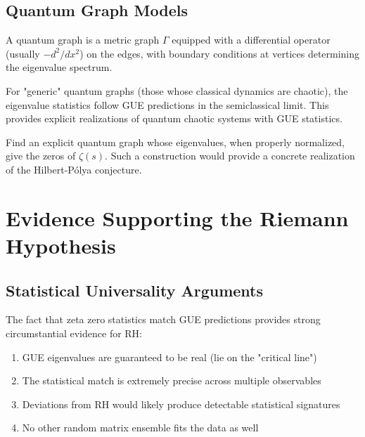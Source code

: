 \subsection{Quantum Graph Models}

\begin{definition}
A quantum graph is a metric graph $\Gamma$ equipped with a differential operator (usually $-d^2/dx^2$) on the edges, with boundary conditions at vertices determining the eigenvalue spectrum.
\end{definition}

\begin{theorem}
\label{thm:quantum_graph_stats}
For "generic" quantum graphs (those whose classical dynamics are chaotic), the eigenvalue statistics follow GUE predictions in the semiclassical limit. This provides explicit realizations of quantum chaotic systems with GUE statistics.
\end{theorem}

\begin{openproblem}
Find an explicit quantum graph whose eigenvalues, when properly normalized, give the zeros of $\zeta(s)$. Such a construction would provide a concrete realization of the Hilbert-Pólya conjecture.
\end{openproblem}

\section{Evidence Supporting the Riemann Hypothesis}
\label{sec:rh_evidence}

\subsection{Statistical Universality Arguments}

\begin{argument}
The fact that zeta zero statistics match GUE predictions provides strong circumstantial evidence for RH:
\begin{enumerate}
\item GUE eigenvalues are guaranteed to be real (lie on the "critical line")
\item The statistical match is extremely precise across multiple observables
\item Deviations from RH would likely produce detectable statistical signatures
\item No other random matrix ensemble fits the data as well
\end{enumerate}
\end{argument}

